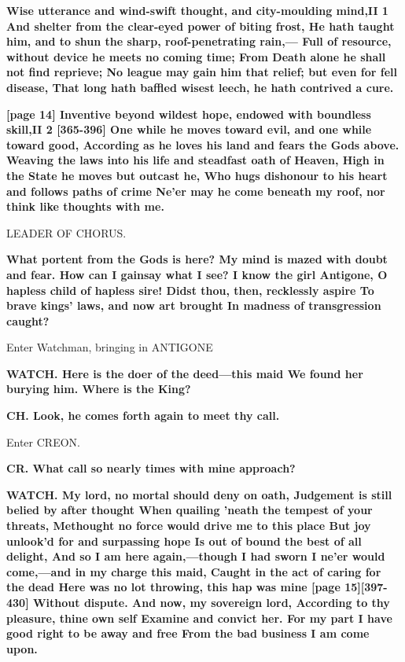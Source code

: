 \documentclass[11pt,letter]{book}
\begin{document}
\par \textbf{Wise utterance and wind-swift thought, and city-moulding mind,II 1 And shelter from the clear-eyed power of biting frost, He hath taught him, and to shun the sharp, roof-penetrating rain,— Full of resource, without device he meets no coming time; From Death alone he shall not find reprieve; No league may gain him that relief; but even for fell disease, That long hath baffled wisest leech, he hath contrived a cure.}
\par 

\par \textbf{[page 14] Inventive beyond wildest hope, endowed with boundless skill,II 2 [365-396] One while he moves toward evil, and one while toward good, According as he loves his land and fears the Gods above. Weaving the laws into his life and steadfast oath of Heaven, High in the State he moves but outcast he, Who hugs dishonour to his heart and follows paths of crime Ne’er may he come beneath my roof, nor think like thoughts with me.}
\par 

\par  LEADER OF CHORUS.

\par \textbf{What portent from the Gods is here? My mind is mazed with doubt and fear. How can I gainsay what I see? I know the girl Antigone, O hapless child of hapless sire! Didst thou, then, recklessly aspire To brave kings’ laws, and now art brought In madness of transgression caught?}
\par 

\par  Enter Watchman, bringing in ANTIGONE

\par \textbf{WATCH. Here is the doer of the deed—this maid We found her burying him. Where is the King?}
\par 

\par \textbf{CH. Look, he comes forth again to meet thy call.}
\par 

\par  Enter CREON.

\par \textbf{CR. What call so nearly times with mine approach?}
\par 

\par \textbf{WATCH. My lord, no mortal should deny on oath, Judgement is still belied by after thought When quailing ’neath the tempest of your threats, Methought no force would drive me to this place But joy unlook’d for and surpassing hope Is out of bound the best of all delight, And so I am here again,—though I had sworn I ne’er would come,—and in my charge this maid, Caught in the act of caring for the dead Here was no lot throwing, this hap was mine [page 15][397-430] Without dispute. And now, my sovereign lord, According to thy pleasure, thine own self Examine and convict her. For my part I have good right to be away and free From the bad business I am come upon.}
\par 
\end{document}
